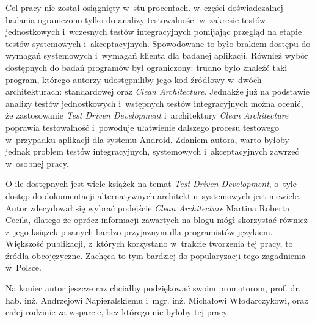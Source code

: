 Cel pracy nie został osiągnięty w~stu procentach. w~części doświadczalnej badania ograniczono tylko do analizy testowalności w~zakresie testów jednostkowych i~wczesnych testów integracyjnych pomijając przegląd na etapie testów systemowych i~akceptacyjnych. Spowodowane to było brakiem dostępu do wymagań systemowych i~wymagań klienta dla badanej aplikacji. Również wybór dostępnych do badań programów był ograniczony: trudno było znaleźć taki program, którego autorzy udostępniliby jego kod źródłowy w~dwóch architekturach: standardowej oraz \textit{Clean Architecture}. Jednakże już na podstawie analizy testów jednostkowych i~wstępnych testów integracyjnych można ocenić, że zastosowanie \textit{Test Driven Development} i~architektury \textit{Clean Architecture} poprawia testowalność i~powoduje ułatwienie dalszego procesu testowego w~przypadku aplikacji dla systemu Android. Zdaniem autora, warto byłoby jednak problem testów integracyjnych, systemowych i~akceptacyjnych zawrzeć w~osobnej pracy.

O ile dostępnych jest wiele książek na temat \textit{Test Driven Development}, o~tyle dostęp do dokumentacji alternatywnych architektur systemowych jest niewiele. Autor zdecydował się wybrać podejście \textit{Clean Architecture} Martina Roberta Cecila, dlatego że oprócz informacji zawartych na blogu mógł skorzystać również z~jego książek pisanych bardzo przyjaznym dla programistów językiem. Większość publikacji, z~których korzystano w~trakcie tworzenia tej pracy, to źródła obcojęzyczne. Zachęca to tym bardziej do popularyzacji tego zagadnienia w~Polsce.

Na koniec autor jeszcze raz chciałby podziękować swoim promotorom, prof. dr. hab. inż. Andrzejowi Napieralskiemu i~mgr. inż. Michałowi Włodarczykowi, oraz całej rodzinie za wsparcie, bez którego nie byłoby tej pracy.

